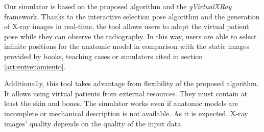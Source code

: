 Our simulator is based on the proposed algorithm and the \emph{gVirtualXRay} framework. Thanks to the interactive selection pose algorithm and the generation of X-ray images in real-time, the tool allows users to adapt the virtual patient pose while they can observe the radiography. In this way, users are able to select infinite positions for the anatomic model in comparison with the static images provided by books, teaching cases or simulators cited in section \ref{art:entrenamiento}.

Additionally, this tool takes advantage from flexibility of the proposed algorithm. It allows using virtual patients from external resources. They must contain at least the skin and bones. The simulator works even if anatomic models are incomplete or mechanical description is not available. As it is expected, X-ray images' quality depends on the quality of the input data. 



